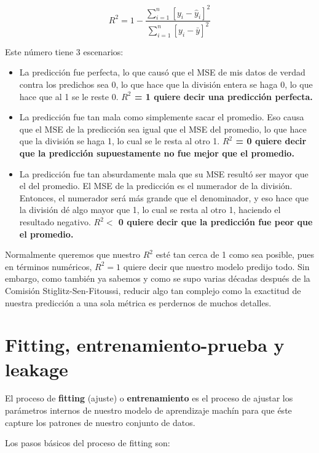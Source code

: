 \documentclass[spanish,oneside]{book} %
\begin{document}
\[
   R^2 = 1 - \frac{\sum_{i=1}^{n}[y_i - \hat{y}_i]^2}{\sum_{i=1}^{n}[y_i - \bar{y}]^2}
\]

Este número tiene 3 escenarios:

\begin{itemize}
   \item La predicción fue perfecta, lo que causó que el MSE de mis datos de verdad contra los predichos sea 0, lo que hace que la división entera se haga 0, lo que hace que al 1 se le reste 0. \textbf{$R^2$ = 1 quiere decir una predicción perfecta.}
   \item La predicción fue tan mala como simplemente sacar el promedio. Eso causa que el MSE de la predicción sea igual que el MSE del promedio, lo que hace que la división se haga 1, lo cual se le resta al otro 1. \textbf{$R^2$ = 0 quiere decir que la predicción supuestamente no fue mejor que el promedio.}
   \item La predicción fue tan absurdamente mala que su MSE resultó ser mayor que el del promedio. El MSE de la predicción es el numerador de la división. Entonces, el numerador será más grande que el denominador, y eso hace que la división dé algo mayor que 1, lo cual se resta al otro 1, haciendo el resultado negativo. \textbf{$R^2 <$ 0 quiere decir que la predicción fue peor que el promedio.}
\end{itemize}

Normalmente queremos que nuestro $R^2$ esté tan cerca de 1 como sea posible, pues en términos numéricos, $R^2 = 1$ quiere decir que nuestro modelo predijo todo. Sin embargo, como también ya sabemos y como se supo varias décadas después de la Comisión Stiglitz-Sen-Fitoussi, reducir algo tan complejo como la exactitud de nuestra predicción a una sola métrica es perdernos de muchos detalles.




\section {Fitting, entrenamiento-prueba y leakage}

El proceso de \textbf{fitting} (ajuste) o \textbf{entrenamiento} es el proceso de ajustar los parámetros internos de nuestro modelo de aprendizaje machín para que éste capture los patrones de nuestro conjunto de datos.

Los pasos básicos del proceso de fitting son:
\end{document}
